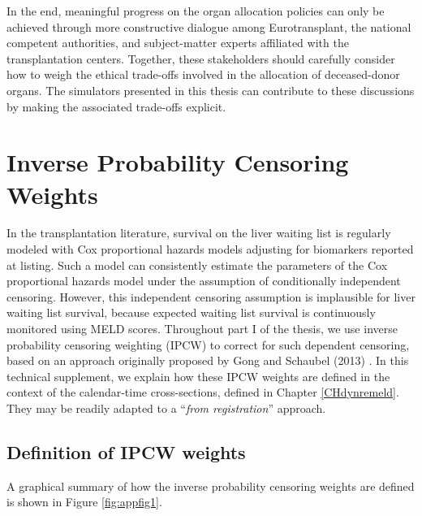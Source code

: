\documentclass[11pt,twoside,]{book}
\begin{document}
In the end, meaningful progress on the organ allocation policies can only be
achieved through more constructive dialogue among Eurotransplant, the national
competent authorities, and subject-matter experts affiliated with the transplantation
centers. Together, these stakeholders should carefully consider how to weigh
the ethical trade-offs involved in the allocation of deceased-donor organs. The
simulators presented in this thesis can contribute to these discussions
by making the associated trade-offs explicit.

\appendix

\chapter{Inverse Probability Censoring Weights}\label{APPipcw}


In the transplantation literature, survival on the liver waiting list is regularly
modeled with Cox proportional hazards models adjusting for biomarkers reported at
listing. Such a model can consistently estimate the parameters of the Cox
proportional hazards model under the assumption of conditionally independent censoring.
However, this independent censoring assumption is implausible for liver waiting list
survival, because expected waiting list survival is continuously monitored using
MELD scores. Throughout part I of the thesis, we use
inverse probability censoring weighting (IPCW) to correct for such dependent censoring,
based on an approach originally proposed by Gong and Schaubel (2013)
\citep{gongPartlyConditionalEstimation2013}. In this technical supplement, we explain
how these IPCW weights are defined in the context of the calendar-time
cross-sections, defined in Chapter \ref{CHdynremeld}. They may be readily
adapted to a ``\emph{from registration}'' approach.

\section*{Definition of IPCW weights}\label{definition-of-ipcw-weights}

A graphical summary of how the inverse probability censoring weights are
defined is shown in Figure \ref{fig:appfig1}.
\end{document}
